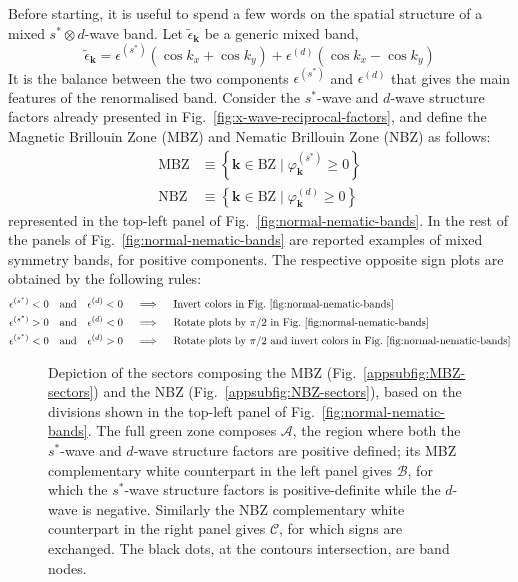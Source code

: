 Before starting, it is useful to spend a few words on the spatial structure of a mixed $s^* \otimes d$-wave band. Let $\tilde{\epsilon}_\mathbf{k}$ be a generic mixed band,
\[
	\tilde{\epsilon}_\mathbf{k} = \epsilon^{(s^*)} (\cos k_x + \cos k_y) + \epsilon^{(d)} (\cos k_x - \cos k_y)
\]
It is the balance between the two components $\epsilon^{(s^*)}$ and $\epsilon^{(d)}$ that gives the main features of the renormalised band. Consider the $s^*$-wave and $d$-wave structure factors already presented in Fig.~\ref{fig:x-wave-reciprocal-factors}, and define the Magnetic Brillouin Zone (MBZ) and Nematic Brillouin Zone (NBZ) as follows:
\begin{align}
	\mathrm{MBZ} &\equiv \left\lbrace
	\mathbf{k}\in\mathrm{BZ}
	\mid 
	\varphi_\mathbf{k}^{(s^*)} \ge 0
	\right\rbrace \label{appeq:MBZ-def} \\
	\mathrm{NBZ} &\equiv \left\lbrace
	\mathbf{k}\in\mathrm{BZ}
	\mid 
	\varphi_\mathbf{k}^{(d)} \ge 0
	\right\rbrace \label{appeq:NBZ-def}
\end{align}
represented in the top-left panel of Fig.~\ref{fig:normal-nematic-bands}. In the rest of the panels of Fig.~\ref{fig:normal-nematic-bands} are reported examples of mixed symmetry bands, for positive components. The respective opposite sign plots are obtained by the following rules:
\[
\begin{aligned}
	\epsilon^{(s^*)} < 0 \qq{and} \epsilon^{(d)} < 0
	\quad&\implies\quad \text{Invert colors in Fig.~\ref{fig:normal-nematic-bands}} \\
	\epsilon^{(s^*)} > 0 \qq{and} \epsilon^{(d)} < 0
	\quad&\implies\quad \text{Rotate plots by $\pi/2$ in Fig.~\ref{fig:normal-nematic-bands}} \\
	\epsilon^{(s^*)} < 0 \qq{and} \epsilon^{(d)} > 0
	\quad&\implies\quad \text{Rotate plots by $\pi/2$ and invert colors in Fig.~\ref{fig:normal-nematic-bands}} \\
\end{aligned}
\]

\begin{figure}
	\centering
	\caption{Depiction of the sectors composing the MBZ (Fig.~\ref{appsubfig:MBZ-sectors}) and the NBZ (Fig.~\ref{appsubfig:NBZ-sectors}), based on the divisions shown in the top-left panel of Fig.~\ref{fig:normal-nematic-bands}. The full green zone composes $\mathcal{A}$, the region where both the $s^*$-wave and $d$-wave structure factors are positive defined; its MBZ complementary white counterpart in the left panel gives $\mathcal{B}$, for which the $s^*$-wave structure factors is positive-definite while the $d$-wave is negative. Similarly the NBZ complementary white counterpart in the right panel gives $\mathcal{C}$, for which signs are exchanged. The black dots, at the contours intersection, are band nodes.}
	\label{appfig:BZ-sectors}
\end{figure}

